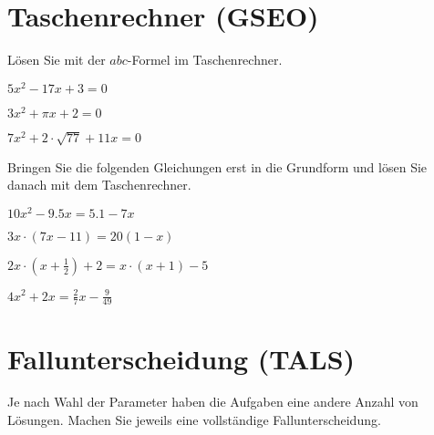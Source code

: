 \section{Taschenrechner (GSEO)}
Lösen Sie mit der $abc$-Formel im Taschenrechner.


\begin{bbwAufgabenBlock}
\item $ 5x^2-17x+3= 0$

\item $ 3x^2+\pi x + 2= 0$
\LoesungsBlock{$\lx= \left\{  \right\}$}

\item $ 7x^2 + 2\cdot{}\sqrt{77} + 11x= 0$

Bringen Sie die folgenden Gleichungen erst in die Grundform und lösen
Sie danach mit dem Taschenrechner.

\item $ 10x^2 -9.5x = 5.1 - 7x $

\item $ 3x\cdot{}(7x-11)= 20(1-x)$

\item $ 2x\cdot{}(x+\frac12) + 2 = x\cdot{}(x+1) -5 $
\LoesungsBlock{$\lx= \left\{   \right\}$}

\item $ 4x^2 + 2x = \frac27 x - \frac9{49} $


\end{bbwAufgabenBlock}
\newpage

\section{Fallunterscheidung (TALS)}

Je nach Wahl der Parameter haben die Aufgaben eine andere Anzahl von
Lösungen. Machen Sie jeweils eine vollständige Fallunterscheidung.


